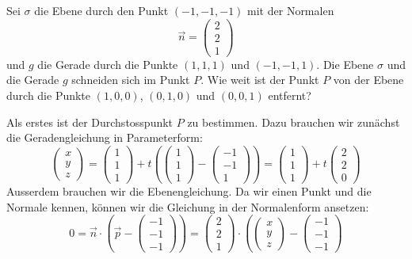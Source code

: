 Sei $\sigma$ die Ebene durch den Punkt $(-1,-1,-1)$ mit der Normalen 
\[
\vec n=\begin{pmatrix}2\\2\\1\end{pmatrix}
\]
und $g$ die Gerade durch die Punkte $(1,1,1)$ und $(-1,-1,1)$.
Die Ebene $\sigma$ und die Gerade $g$ schneiden sich im Punkt $P$.
Wie weit ist der Punkt $P$ von der Ebene durch die Punkte
$(1,0,0)$, $(0,1,0)$ und $(0,0,1)$ entfernt?

\begin{loesung}
Als erstes ist der Durchstosspunkt $P$ zu bestimmen.
Dazu brauchen wir zunächst die Geradengleichung in Parameterform:
\[
\begin{pmatrix} x\\y\\z \end{pmatrix}
=
\begin{pmatrix}1\\1\\1\end{pmatrix}+t
\left(
\begin{pmatrix}1\\1\\1\end{pmatrix}
-
\begin{pmatrix}-1\\-1\\1\end{pmatrix}
\right)
=
\begin{pmatrix}1\\1\\1\end{pmatrix}+t
\begin{pmatrix}2\\2\\0\end{pmatrix}
\]
Ausserdem brauchen wir die Ebenengleichung. Da wir einen Punkt und
die Normale kennen, können wir die Gleichung in der Normalenform
ansetzen:
\[
0=\vec n\cdot \left(\vec p-\begin{pmatrix}-1\\-1\\-1\end{pmatrix}\right)
=
\begin{pmatrix}2\\2\\1\end{pmatrix}\cdot\left(
\begin{pmatrix}x\\y\\z\end{pmatrix}-\begin{pmatrix}-1\\-1\\-1\end{pmatrix}
\]
\end{loesung}
